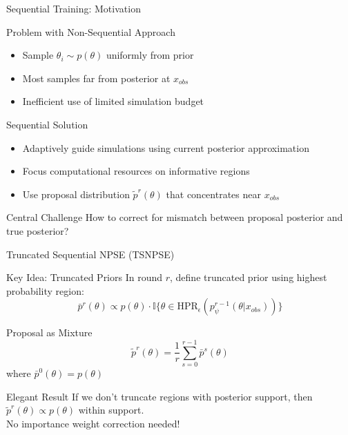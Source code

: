 \documentclass{beamer}
\begin{document}
\begin{frame}{Sequential Training: Motivation}

\begin{block}{Problem with Non-Sequential Approach}
\begin{itemize}
    \item Sample $\theta_i \sim p(\theta)$ uniformly from prior
    \item Most samples far from posterior at $x_{obs}$
    \item Inefficient use of limited simulation budget
\end{itemize}
\end{block}

\begin{block}{Sequential Solution}
\begin{itemize}
    \item Adaptively guide simulations using current posterior approximation
    \item Focus computational resources on informative regions
    \item Use proposal distribution $\tilde{p}^r(\theta)$ that concentrates near $x_{obs}$
\end{itemize}
\end{block}

\begin{block}{Central Challenge}
How to correct for mismatch between proposal posterior and true posterior?
\end{block}

\end{frame}

\begin{frame}{Truncated Sequential NPSE (TSNPSE)}

\begin{block}{Key Idea: Truncated Priors}
In round $r$, define truncated prior using highest probability region:
\begin{equation*}
\bar{p}^r(\theta) \propto p(\theta) \cdot \mathbb{I}\{\theta \in \text{HPR}_\epsilon(p_\psi^{r-1}(\theta|x_{obs}))\}
\end{equation*}
\end{block}

\begin{block}{Proposal as Mixture}
\begin{equation*}
\tilde{p}^r(\theta) = \frac{1}{r}\sum_{s=0}^{r-1} \bar{p}^s(\theta)
\end{equation*}
where $\bar{p}^0(\theta) = p(\theta)$
\end{block}

\begin{block}{Elegant Result}
If we don't truncate regions with posterior support, then $\tilde{p}^r(\theta) \propto p(\theta)$ within support.\\
No importance weight correction needed!
\end{block}

\end{frame}
\end{document}
